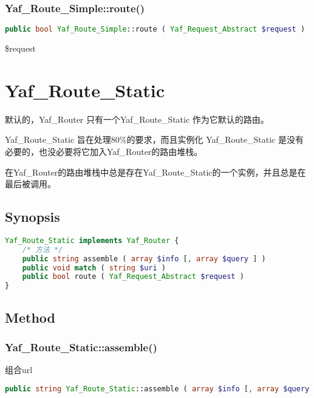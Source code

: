 \subsection{Yaf\_Route\_Simple::route()}



\begin{lstlisting}[language=PHP]
public bool Yaf_Route_Simple::route ( Yaf_Request_Abstract $request )
\end{lstlisting}

\begin{compactitem}
\item \$request
\end{compactitem}

\chapter{Yaf\_Route\_Static}

默认的，Yaf\_Router 只有一个Yaf\_Route\_Static 作为它默认的路由。

Yaf\_Route\_Static 旨在处理80\%的要求，而且实例化 Yaf\_Route\_Static 是没有必要的，也没必要将它加入Yaf\_Router的路由堆栈。

在Yaf\_Router的路由堆栈中总是存在Yaf\_Route\_Static的一个实例，并且总是在最后被调用。

\section{Synopsis}

\begin{lstlisting}[language=PHP]
Yaf_Route_Static implements Yaf_Router {
    /* 方法 */
    public string assemble ( array $info [, array $query ] )
    public void match ( string $uri )
    public bool route ( Yaf_Request_Abstract $request )
}
\end{lstlisting}

\section{Method}


\subsection{Yaf\_Route\_Static::assemble()}

组合url





\begin{lstlisting}[language=PHP]
public string Yaf_Route_Static::assemble ( array $info [, array $query ] )
\end{lstlisting}

